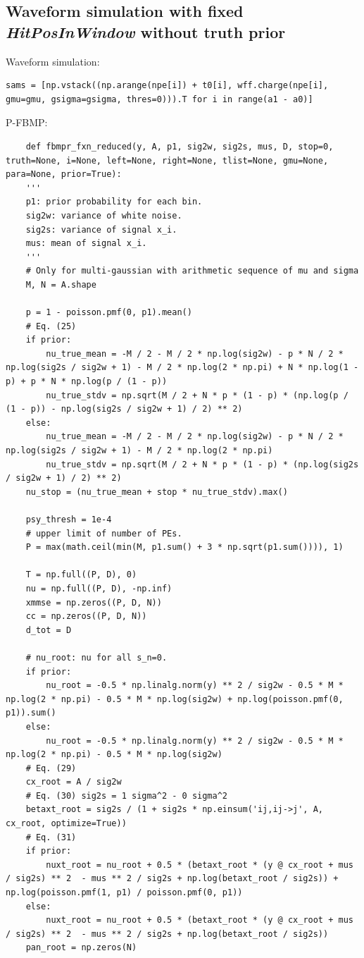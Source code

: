 \documentclass[notitlepage]{article}
\begin{document}
\subsection{Waveform simulation with fixed \textit{HitPosInWindow} \textbf{without} truth prior}

Waveform simulation:

\begin{lstlisting}
sams = [np.vstack((np.arange(npe[i]) + t0[i], wff.charge(npe[i], gmu=gmu, gsigma=gsigma, thres=0))).T for i in range(a1 - a0)]
\end{lstlisting}

P-FBMP:

\begin{lstlisting}
    def fbmpr_fxn_reduced(y, A, p1, sig2w, sig2s, mus, D, stop=0, truth=None, i=None, left=None, right=None, tlist=None, gmu=None, para=None, prior=True):
    '''
    p1: prior probability for each bin.
    sig2w: variance of white noise.
    sig2s: variance of signal x_i.
    mus: mean of signal x_i.
    '''
    # Only for multi-gaussian with arithmetic sequence of mu and sigma
    M, N = A.shape

    p = 1 - poisson.pmf(0, p1).mean()
    # Eq. (25)
    if prior:
        nu_true_mean = -M / 2 - M / 2 * np.log(sig2w) - p * N / 2 * np.log(sig2s / sig2w + 1) - M / 2 * np.log(2 * np.pi) + N * np.log(1 - p) + p * N * np.log(p / (1 - p))
        nu_true_stdv = np.sqrt(M / 2 + N * p * (1 - p) * (np.log(p / (1 - p)) - np.log(sig2s / sig2w + 1) / 2) ** 2)
    else:
        nu_true_mean = -M / 2 - M / 2 * np.log(sig2w) - p * N / 2 * np.log(sig2s / sig2w + 1) - M / 2 * np.log(2 * np.pi)
        nu_true_stdv = np.sqrt(M / 2 + N * p * (1 - p) * (np.log(sig2s / sig2w + 1) / 2) ** 2)
    nu_stop = (nu_true_mean + stop * nu_true_stdv).max()

    psy_thresh = 1e-4
    # upper limit of number of PEs.
    P = max(math.ceil(min(M, p1.sum() + 3 * np.sqrt(p1.sum()))), 1)

    T = np.full((P, D), 0)
    nu = np.full((P, D), -np.inf)
    xmmse = np.zeros((P, D, N))
    cc = np.zeros((P, D, N))
    d_tot = D

    # nu_root: nu for all s_n=0.
    if prior:
        nu_root = -0.5 * np.linalg.norm(y) ** 2 / sig2w - 0.5 * M * np.log(2 * np.pi) - 0.5 * M * np.log(sig2w) + np.log(poisson.pmf(0, p1)).sum()
    else:
        nu_root = -0.5 * np.linalg.norm(y) ** 2 / sig2w - 0.5 * M * np.log(2 * np.pi) - 0.5 * M * np.log(sig2w)
    # Eq. (29)
    cx_root = A / sig2w
    # Eq. (30) sig2s = 1 sigma^2 - 0 sigma^2
    betaxt_root = sig2s / (1 + sig2s * np.einsum('ij,ij->j', A, cx_root, optimize=True))
    # Eq. (31)
    if prior:
        nuxt_root = nu_root + 0.5 * (betaxt_root * (y @ cx_root + mus / sig2s) ** 2  - mus ** 2 / sig2s + np.log(betaxt_root / sig2s)) + np.log(poisson.pmf(1, p1) / poisson.pmf(0, p1))
    else:
        nuxt_root = nu_root + 0.5 * (betaxt_root * (y @ cx_root + mus / sig2s) ** 2  - mus ** 2 / sig2s + np.log(betaxt_root / sig2s))
    pan_root = np.zeros(N)


\end{lstlisting}
\end{document}
